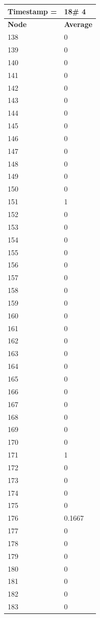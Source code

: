 \begin{tabular}{|l||l|}
\hline
\textbf{Timestamp =} & \textbf{18}\# 4\\\hline
	\textbf{Node} & \textbf{Average} \\ \hline
\hline
	138 & 0 \\ \hline
	139 & 0 \\ \hline
	140 & 0 \\ \hline
	141 & 0 \\ \hline
	142 & 0 \\ \hline
	143 & 0 \\ \hline
	144 & 0 \\ \hline
	145 & 0 \\ \hline
	146 & 0 \\ \hline
	147 & 0 \\ \hline
	148 & 0 \\ \hline
	149 & 0 \\ \hline
	150 & 0 \\ \hline
	151 & 1 \\ \hline
	152 & 0 \\ \hline
	153 & 0 \\ \hline
	154 & 0 \\ \hline
	155 & 0 \\ \hline
	156 & 0 \\ \hline
	157 & 0 \\ \hline
	158 & 0 \\ \hline
	159 & 0 \\ \hline
	160 & 0 \\ \hline
	161 & 0 \\ \hline
	162 & 0 \\ \hline
	163 & 0 \\ \hline
	164 & 0 \\ \hline
	165 & 0 \\ \hline
	166 & 0 \\ \hline
	167 & 0 \\ \hline
	168 & 0 \\ \hline
	169 & 0 \\ \hline
	170 & 0 \\ \hline
	171 & 1 \\ \hline
	172 & 0 \\ \hline
	173 & 0 \\ \hline
	174 & 0 \\ \hline
	175 & 0 \\ \hline
	176 & 0.1667 \\ \hline
	177 & 0 \\ \hline
	178 & 0 \\ \hline
	179 & 0 \\ \hline
	180 & 0 \\ \hline
	181 & 0 \\ \hline
	182 & 0 \\ \hline
	183 & 0 \\ \hline
\end{tabular}
